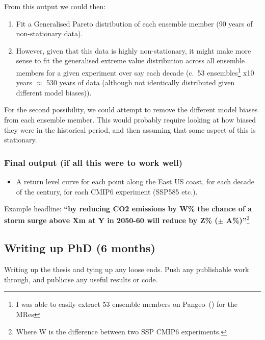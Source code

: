 \documentclass[usenames, dvipsnames]{article}      %
\begin{document}
From this output we could then:

\begin{enumerate}
 \item Fit a Generalised Pareto distribution of each ensemble 
       member (90 years of non-stationary data).
    
 \item However, given that this data is highly non-stationary,
    it might make more sense to fit the generalised extreme
    value distribution across all ensemble members for a given
    experiment over say each decade (c.~53 ensembles\footnote{
    I was able to easily extract 53 ensemble members on
    Pangeo~(\cite{Abernathey2017})
    for the MRes} x10 years $\approx$ 530 years of
    data  (although not identically
    distributed given different model biases)).
\end{enumerate}

For the second possibility, we could attempt to remove 
the different model biases from each ensemble member.
This would probably require looking at how biased they were in
the  historical period, and then assuming that some aspect of this is stationary.


\subsubsection*{Final output (if all this were to work well)}

\begin{itemize}
    \item A return level curve for each point along the
    East US coast,
    for each decade of the century, 
    for each CMIP6 experiment
    (SSP585 etc.).
\end{itemize}

Example headline: \textbf{``by reducing CO2 emissions 
by W\% the chance of a storm surge above Xm
 at Y in 2050-60 will reduce
by Z\% ($\pm$ A\%)''}\footnote{Where W is the difference between two 
SSP CMIP6 experiments.}


\subsection*{Writing up PhD (6 months)}

Writing up the thesis and tying up any loose ends. Push any publishable work through, and publicise any useful results or
code.

\printbibliography
\end{document}
